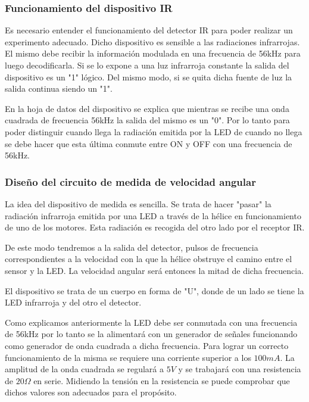 \documentclass[spanish,12pt,a4paper,titlepage]{report}
\begin{document}
\subsubsection*{Funcionamiento del dispositivo IR}
Es necesario entender el funcionamiento del detector IR para poder realizar un experimento adecuado. Dicho dispositivo es sensible a las radiaciones infrarrojas. El mismo debe recibir la información modulada en una frecuencia de 56kHz para luego decodificarla. Si se lo expone a una luz infrarroja constante la salida del dispositivo es un "1" lógico. Del mismo modo, si se quita dicha fuente de luz la salida continua siendo un "1". 

En la hoja de datos del dispositivo se explica que mientras se recibe una onda cuadrada de frecuencia 56kHz la salida del mismo es un "0". Por lo tanto para poder distinguir cuando llega la radiación emitida por la LED de cuando no llega se debe hacer que esta última conmute entre ON y OFF con una frecuencia de 56kHz.

\subsubsection*{Diseño del circuito de medida de velocidad angular}

La idea del dispositivo de medida es sencilla. Se trata de hacer "pasar" la radiación infrarroja emitida por una LED a través de la hélice en funcionamiento de uno de los motores. Esta radiación es recogida del otro lado por el receptor IR.

De este modo tendremos a la salida del detector, pulsos de frecuencia correspondientes a la velocidad con la que la hélice obstruye el camino entre el sensor y la LED. La velocidad angular será entonces la mitad de dicha frecuencia. 

El dispositivo se trata de un cuerpo en forma de "U", donde de un lado se tiene la LED infrarroja y del otro el detector.

Como explicamos anteriormente la LED debe ser conmutada con una frecuencia de 56kHz por lo tanto se la alimentará con un generador de señales funcionando como generador de onda cuadrada a dicha frecuencia. Para lograr un correcto funcionamiento de la misma se requiere una corriente superior a los $100mA$. La amplitud de la onda cuadrada se regulará a $5V$ y se trabajará con una resistencia de $20\Omega$ en serie. Midiendo la tensión en la resistencia se puede comprobar que dichos valores son adecuados para el propósito.
\end{document}
